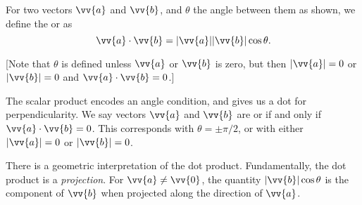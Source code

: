 \begin{center}
  \end{center}

\begin{definition}
    For two vectors $\vv{a}$ and $\vv{b}$, and $\theta$ the angle between them as shown, we define the  or  as
    $$
    \vv{a} \cdot \vv{b} = |\vv{a}| |\vv{b}| \cos \theta.
    $$

    [Note that $\theta$ is defined unless $\vv{a}$ or $\vv{b}$ is zero, but then $|\vv{a}| = 0$ or $|\vv{b}| = 0$ and $\vv{a} \cdot \vv{b} = 0$.]
\end{definition}

The scalar product encodes an angle condition, and gives us a dot for perpendicularity. We say vectors $\vv{a}$ and $\vv{b}$ are  or  if and only if $\vv{a} \cdot \vv{b} = 0$. This corresponds with $\theta = \pm \pi/2$, or with either $|\vv{a}| = 0$ or $|\vv{b}| = 0$.

There is a geometric interpretation of the dot product. Fundamentally, the dot product is a \emph{projection}. For $\vv{a} \neq \vv{0}$, the quantity $|\vv{b}| \cos \theta$ is the component of $\vv{b}$ when projected along the direction of $\vv{a}$.

